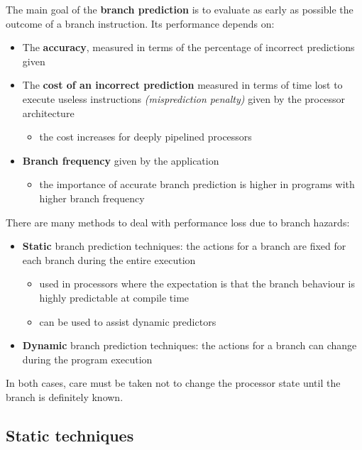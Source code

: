 \documentclass[english]{article}
\begin{document}
The main goal of the \textbf{branch prediction} is to evaluate as early as possible the outcome of a branch instruction.
Its performance depends on:

\begin{itemize}
  \item The \textbf{accuracy}, measured in terms of the percentage of incorrect predictions given
  \item The \textbf{cost of an incorrect prediction} measured in terms of time lost to execute useless instructions \textit{(misprediction penalty)} given by the processor architecture
        \begin{itemize}
          \item the cost increases for deeply pipelined processors
        \end{itemize}
  \item \textbf{Branch frequency} given by the application
        \begin{itemize}
          \item the importance of accurate branch prediction is higher in programs with higher branch frequency
        \end{itemize}
\end{itemize}

There are many methods to deal with performance loss due to branch hazards:

\begin{itemize}
  \item \textbf{Static} branch prediction techniques: the actions for a branch are fixed for each branch during the entire execution
        \begin{itemize}
          \item used in processors where the expectation is that the branch behaviour is highly predictable at compile time
          \item can be used to assist dynamic predictors
        \end{itemize}
  \item \textbf{Dynamic} branch prediction techniques: the actions for a branch can change during the program execution
\end{itemize}

In both cases, care must be taken not to change the processor state until the branch is definitely known.

\subsection{Static techniques}
\end{document}
